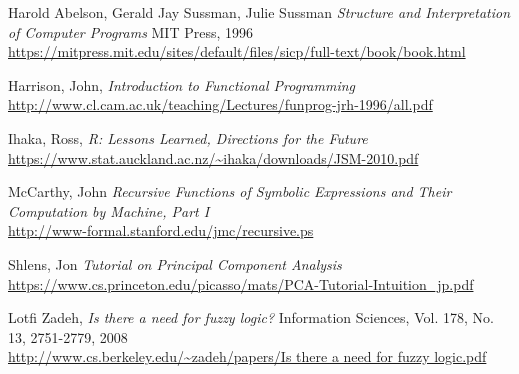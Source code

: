 \begin{thebibliography}{9}
  Harold Abelson, Gerald Jay Sussman, Julie Sussman
  \emph{Structure and Interpretation of Computer Programs}
  MIT Press, 1996 \\
  \url{https://mitpress.mit.edu/sites/default/files/sicp/full-text/book/book.html}

  Harrison, John,
  \emph{Introduction to Functional Programming} \\
  \url{http://www.cl.cam.ac.uk/teaching/Lectures/funprog-jrh-1996/all.pdf}

  Ihaka, Ross, 
  \emph{R: Lessons Learned, Directions for the Future} \\
  \url{https://www.stat.auckland.ac.nz/~ihaka/downloads/JSM-2010.pdf}

  McCarthy, John
  \emph{Recursive Functions of Symbolic Expressions and Their Computation by Machine, Part I} \\
  \url{http://www-formal.stanford.edu/jmc/recursive.ps}

  Shlens, Jon
  \emph{Tutorial on Principal Component Analysis}
  \url{https://www.cs.princeton.edu/picasso/mats/PCA-Tutorial-Intuition_jp.pdf}

  Lotfi Zadeh, 
  \emph{Is there a need for fuzzy logic?}
  Information Sciences, Vol. 178, No. 13, 2751-2779, 2008 \\
  \url{http://www.cs.berkeley.edu/~zadeh/papers/Is there a need for fuzzy logic.pdf}

\end{thebibliography}
